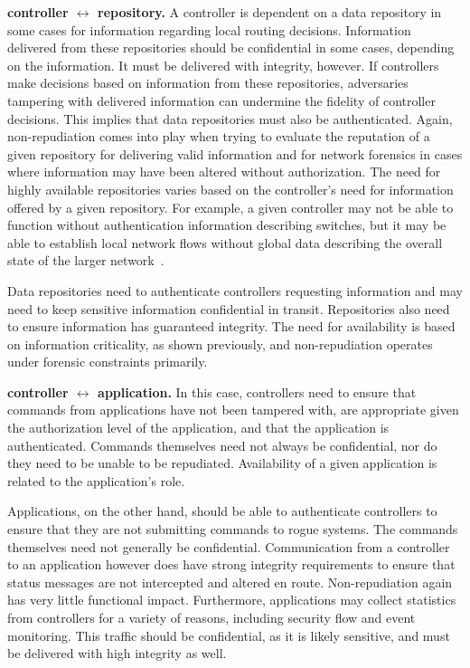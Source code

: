 \documentclass[10pt,conference]{IEEEtran}
\begin{document}
\noindent
{\bf controller $\leftrightarrow$ repository.}
A controller is dependent on a data repository in some cases for information regarding local routing decisions.  Information delivered from these repositories should be confidential in some cases, depending on the information.  It must be delivered with integrity, however.  If controllers make decisions based on information from these repositories, adversaries tampering with delivered information can undermine the fidelity of controller decisions.  This implies that data repositories must also be authenticated.  Again, non-repudiation comes into play when trying to evaluate the reputation of a given repository for delivering valid information and for network forensics in cases where information may have been altered without authorization.  The need for highly available repositories varies based on the controller's need for information offered by a given repository.  For example, a given controller may not be able to function without authentication information describing switches, but it may be able to establish local network flows without global data describing the overall state of the larger network~\cite{ScSu:13}.

Data repositories need to authenticate controllers requesting information and may need to keep sensitive information confidential in transit.  Repositories also need to ensure information has guaranteed integrity.  The need for availability is based on information criticality, as shown previously, and non-repudiation operates under forensic constraints primarily.

\noindent
{\bf controller $\leftrightarrow$ application.}
In this case, controllers need to ensure that commands from applications have not been tampered with, are appropriate given the authorization level of the application, and that the application is authenticated.  Commands themselves need not always be confidential, nor do they need to be unable to be repudiated.  Availability of a given application is related to the application's role.

Applications, on the other hand, should be able to authenticate controllers to ensure that they are not submitting commands to rogue systems.  The commands themselves need not generally be confidential.  Communication from a controller to an application however does have strong integrity requirements to ensure that status messages are not intercepted and altered en route.  Non-repudiation again has very little functional impact.  Furthermore, applications may collect statistics from controllers for a variety of reasons, including security flow and event monitoring.  This traffic should be confidential, as it is likely sensitive, and must be delivered with high integrity as well.
\end{document}
